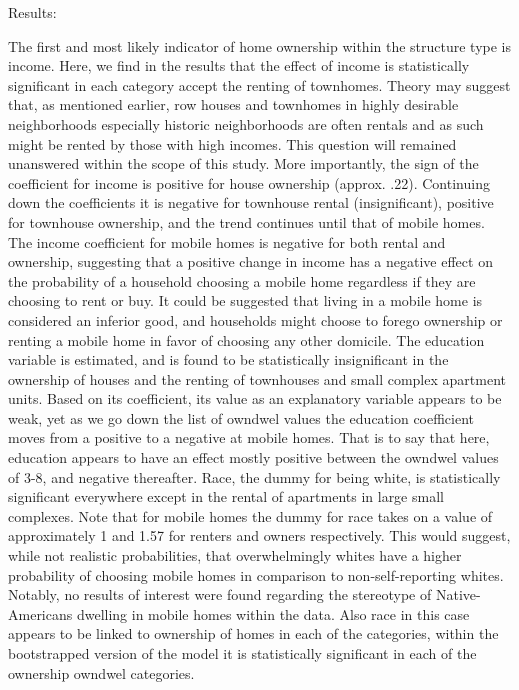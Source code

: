 \documentclass{article}
\begin{document}
Results:

The first and most likely indicator of home ownership within the structure type is income.  Here, we find in the results that the effect of income is statistically significant in each category accept the renting of townhomes.  Theory may suggest that, as mentioned earlier, row houses and townhomes in highly desirable neighborhoods especially historic neighborhoods are often rentals and as such might be rented by those with high incomes.  This question will remained unanswered within the scope of this study. 
 More importantly, the sign of the coefficient for income is positive for house ownership (approx. .22).  Continuing down the coefficients it is negative for townhouse rental (insignificant), positive for townhouse ownership, and the trend continues until that of mobile homes.  The income coefficient for mobile homes is negative for both rental and ownership, suggesting that a positive change in income has a negative effect on the probability of a household choosing a mobile home regardless if they are choosing to rent or buy.  It could be suggested that living in a mobile home is considered an inferior good, and households might choose to forego ownership or renting a mobile home in favor of choosing any other domicile.
The education variable is estimated, and is found to be statistically insignificant in the ownership of houses and the renting of townhouses and small complex apartment units.  Based on its coefficient, its value as an explanatory variable appears to be weak, yet as we go down the list of owndwel values the education coefficient moves from a positive to a negative at mobile homes. That is to say that here, education appears to have an effect mostly positive between the owndwel values of 3-8, and negative thereafter.
Race, the dummy for being white, is statistically significant everywhere except in the rental of apartments in large small complexes.  Note that for mobile homes the dummy for race takes on a value of approximately 1 and 1.57 for renters and owners respectively.  This would suggest, while not realistic probabilities, that overwhelmingly whites have a higher probability of choosing mobile homes in comparison to non-self-reporting whites.  Notably, no results of interest were found regarding the stereotype of Native-Americans dwelling in mobile homes within the data.  Also race in this case appears to be linked to ownership of homes in each of the categories, within the bootstrapped version of the model it is statistically significant in each of the ownership owndwel categories.  
\end{document}
